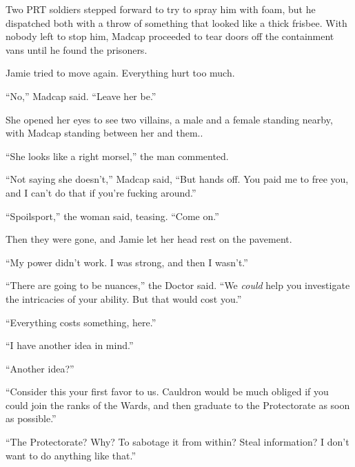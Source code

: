 Two PRT soldiers stepped forward to try to spray him with foam, but he dispatched both with a throw of something that looked like a thick frisbee.  With nobody left to stop him, Madcap proceeded to tear doors off the containment vans until he found the prisoners.



Jamie tried to move again.  Everything hurt too much.



``No,'' Madcap said.  ``Leave her be.''



She opened her eyes to see two villains, a male and a female standing nearby, with Madcap standing between her and them..



``She looks like a right morsel,'' the man commented.



``Not saying she doesn't,'' Madcap said, ``But hands off.  You paid me to free you, and I can't do that if you're fucking around.''



``Spoilsport,'' the woman said, teasing.  ``Come on.''



Then they were gone, and Jamie let her head rest on the pavement.



\blacksquare



``My power didn't work.  I was strong, and then I wasn't.''



``There are going to be nuances,'' the Doctor said.  ``We \emph{could} help you investigate the intricacies of your ability.  But that would cost you.''



``Everything costs something, here.''



``I have another idea in mind.''



``Another idea?''



``Consider this your first favor to us.  Cauldron would be much obliged if you could join the ranks of the Wards, and then graduate to the Protectorate as soon as possible.''



``The Protectorate?  Why?  To sabotage it from within?  Steal information?  I don't want to do anything like that.''



